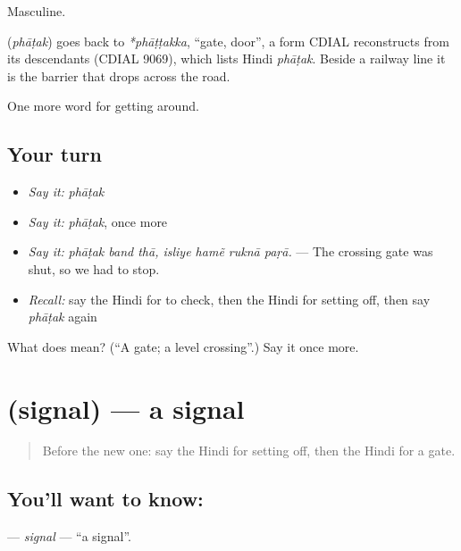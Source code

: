 Masculine.

\begin{cousinweb}
\textbf{} (\emph{phāṭak}) goes back to \emph{*phāṭṭakka}, \textquotedblleft{}gate, door\textquotedblright{}, a form CDIAL reconstructs from its descendants (CDIAL 9069), which lists Hindi \emph{phāṭak}. Beside a railway line it is the barrier that drops across the road.
\end{cousinweb}

\begin{grammarlens}[title={What you've built}]
One more word for getting around.
\end{grammarlens}

\subsection*{Your turn}
\begin{itemize}
\raggedright
  \item \emph{Say it:} \emph{phāṭak}
  \item \emph{Say it:} \emph{phāṭak}, once more
  \item \emph{Say it:} \emph{phāṭak band thā, isliye hamẽ ruknā paṛā.} — The crossing gate was shut, so we had to stop.
  \item \emph{Recall:} say the Hindi for to check, then the Hindi for setting off, then say \emph{phāṭak} again
\end{itemize}

\begin{tcolorbox}[breakable,colback=teal!4,colframe=teal!35!black,title={Before you move on}]
What does  mean? (\textquotedblleft{}A gate; a level crossing\textquotedblright{}.) Say it once more.
\end{tcolorbox}
\section[\texorpdfstring{\hi{सिग्नल} (signal)}{सिग्नल (signal)}]{ (signal) — a signal}

\label{lesson:HI-C401-signal}



\begin{quote}
Before the new one: say the Hindi for setting off, then the Hindi for a gate.
\end{quote}

\subsection*{You'll want to know: }
\textbf{} — \emph{signal} — \textquotedblleft{}a signal\textquotedblright{}.

